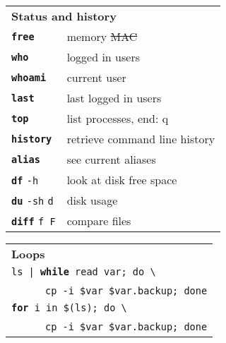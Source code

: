 \documentclass[a4paper,10pt,landscape]{report}
\newcommand{\boxtitle}[1]{{\textbf{\color{RubineRed}#1}}}
\newcommand{\example}[1]{{\texttt{\color{RubineRed}#1}}}
\newcommand{\labbr}[1]{{\texttt{\color{Red}#1}}}
\newcommand{\rabbr}[1]{{\color{Red}#1}}
\newcommand{\co}[1]{\texttt{#1}}
\newcommand{\cob}[1]{\texttt{\textbf{#1}}} %
\begin{document}
\begin{multicols}{4}
\begin{mdframed}[style=mybox]
\begin{tabular}{ l l }
\multicolumn{2}{l}{\boxtitle{Status and history}} \\
\cob{free}                & memory \rabbr{\sout{MAC}} \\
\cob{who}                 & logged in users\\
\cob{whoami}              & current user\\
\cob{last}                & last logged in users\\
\cob{top}                 & list processes, end: q \\
\cob{history}             & retrieve command line history \\
\cob{alias}               & see current aliases \\
\cob{df} \co{-h}          & look at disk free space \\
\cob{du} \co{-sh} \labbr{d}  & disk usage \\
\cob{diff} \labbr{f F}       & compare files \\
\end{tabular}
\end{mdframed}

\begin{mdframed}[style=mybox]
\begin{tabular}{ l }
\multicolumn{1}{l}{\boxtitle{Loops}} \\
\example{ls | \cob{while} read var; do \textbackslash{}} \\
~~~~~~\example{cp -i \$var \$var.backup; done} \\
\example{\cob{for} i in \$(ls); do \textbackslash{}} \\
~~~~~~\example{cp -i \$var \$var.backup; done} \\
\end{tabular}
\end{mdframed}


\end{multicols}
\end{document}
